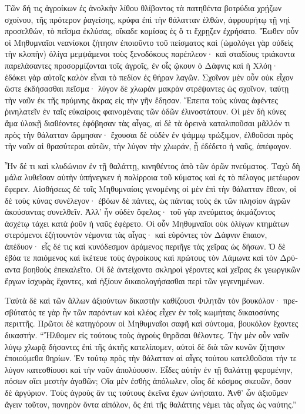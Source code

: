 \documentclass{book}
\begin{document}
\begin{pairs}
\begin{Leftside}
\begin{greek}
  Τῶν δή τις ἀγροίκων ἐς ἀνολκὴν λίθου θλίβοντος τὰ πατηθέντα βοτρύδια χρῄζων σχοίνου, τῆς πρότερον ῥαγείσης, κρύφα ἐπὶ τὴν θάλατταν ἐλθών, ἀφρουρήτῳ τῇ νηὶ προσελθών, τὸ πεῖσμα ἐκλύσας,  οἴκαδε κομίσας ἐς ὅ τι ἔχρῃζεν ἐχρήσατο. Ἕωθεν οὖν οἱ Μηθυμναῖοι νεανίσκοι ζήτησιν ἐποιοῦντο τοῦ πείσματος καὶ (ὡμολόγει γὰρ οὐδεὶς τὴν κλοπὴν) ὀλίγα μεμψάμενοι τοὺς ξενοδόκους παρέπλεον· καὶ σταδίους τριάκοντα παρελάσαντες προσορμίζονται τοῖς ἀγροῖς, ἐν οἷς ᾤκουν ὁ Δάφνις καὶ ἡ Χλόη· ἐδόκει γὰρ αὐτοῖς καλὸν εἶναι τὸ πεδίον ἐς θήραν λαγῶν.  Σχοῖνον μὲν οὖν οὐκ εἶχον ὥστε ἐκδήσασθαι πεῖσμα· λύγον δὲ χλωρὰν μακρὰν στρέψαντες ὡς σχοῖνον, ταύτῃ τὴν ναῦν ἐκ τῆς πρύμνης ἄκρας εἰς τὴν γῆν ἔδησαν. Ἔπειτα τοὺς κύνας ἀφέντες ῥινηλατεῖν ἐν ταῖς εὐκαίροις φαινομέναις τῶν ὁδῶν ἐλινοστάτουν.  Οἱ μὲν δὴ κύνες ἅμα ὑλακῇ διαθέοντες ἐφόβησαν τὰς αἶγας, αἱ δὲ τὰ ὀρεινὰ καταλιποῦσαι μᾶλλόν τι πρὸς τὴν θάλατταν ὥρμησαν· ἔχουσαι δὲ οὐδὲν ἐν ψάμμῳ τρώξιμον, ἐλθοῦσαι πρὸς τὴν ναῦν αἱ θρασύτεραι αὐτῶν, τὴν λύγον τὴν χλωράν, ᾗ ἐδέδετο ἡ ναῦς, ἀπέφαγον.
\pend


  Ἦν δέ τι καὶ κλυδώνιον ἐν τῇ θαλάττῃ, κινηθέντος ἀπὸ τῶν ὀρῶν πνεύματος. Ταχὺ δὴ μάλα λυθεῖσαν αὐτὴν ὑπήνεγκεν ἡ παλίρροια τοῦ κύματος καὶ ἐς τὸ πέλαγος μετέωρον ἔφερεν. Αἰσθήσεως  δὲ τοῖς Μηθυμναίοις γενομένης οἱ μὲν ἐπὶ τὴν θάλατταν ἔθεον, οἱ δὲ τοὺς κύνας συνέλεγον· ἐβόων δὲ πάντες, ὡς πάντας τοὺς ἐκ τῶν πλησίον ἀγρῶν ἀκούσαντας συνελθεῖν. Ἀλλ’ ἦν οὐδὲν ὄφελος· τοῦ γὰρ πνεύματος ἀκμάζοντος ἀσχέτῳ τάχει κατὰ ῥοῦν ἡ ναῦς ἐφέρετο.  Οἱ οὖν Μηθυμναῖοι οὐκ ὀλίγων κτημάτων στερόμενοι ἐζήτουντὸν νέμοντα τὰς αἶγας· καὶ εὑρόντες τὸν Δάφνιν ἔπαιον, ἀπέδυον· εἷς δέ τις καὶ κυνόδεσμον ἀράμενος περιῆγε τὰς χεῖρας ὡς δήσων.  Ὁ δὲ ἐβόα τε παιόμενος καὶ ἱκέτευε τοὺς ἀγροίκους καὶ πρώτους τὸν Λάμωνα καὶ τὸν Δρύαντα βοηθοὺς ἐπεκαλεῖτο. Οἱ δὲ ἀντείχοντο σκληροὶ γέροντες καὶ χεῖρας ἐκ γεωργικῶν ἔργων ἰσχυρὰς ἔχοντες, καὶ ἠξίουν δικαιολογήσασθαι περὶ τῶν γεγενημένων.
\pend


  Ταὐτὰ δὲ καὶ τῶν ἄλλων ἀξιούντων δικαστὴν καθίζουσι Φιλητᾶν τὸν βουκόλον· πρεσβύτατός τε γὰρ ἦν τῶν παρόντων καὶ κλέος εἶχεν ἐν τοῖς κωμήταις δικαιοσύνης περιττῆς. Πρῶτοι δὲ κατηγόρουν οἱ Μηθυμναῖοι σαφῆ καὶ σύντομα, βουκόλον ἔχοντες δικαστήν.  “Ἤλθομεν εἰς τούτους τοὺς ἀγροὺς θηρᾶσαι θέλοντες. Τὴν μὲν οὖν ναῦν λύγῳ χλωρᾷ δήσαντες ἐπὶ τῆς ἀκτῆς κατελίπομεν, αὐτοὶ δὲ διὰ τῶν κυνῶν ζήτησιν ἐποιούμεθα θηρίων. Ἐν τούτῳ πρὸς τὴν θάλατταν αἱ αἶγες τούτου κατελθοῦσαι τήν τε λύγον κατεσθίουσι καὶ τὴν ναῦν ἀπολύουσιν.  Εἶδες αὐτὴν ἐν τῇ θαλάττῃ φερομένην, πόσων οἴει μεστὴν ἀγαθῶν; Οἵα μὲν ἐσθὴς ἀπόλωλεν, οἷος δὲ κόσμος σκευῶν, ὅσον δὲ ἀργύριον. Τοὺς ἀγροὺς ἄν τις τούτους ἐκεῖνα ἔχων ὠνήσαιτο. Ἀνθ’ ὧν ἀξιοῦμεν ἄγειν τοῦτον, πονηρὸν ὄντα αἰπόλον, ὃς ἐπὶ τῆς θαλάττης νέμει τὰς αἶγας ὡς ναύτης.”
\pend



\end{greek}
\end{Leftside}
\end{pairs}
\end{document}
